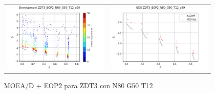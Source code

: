\begin{figure}[H]
\begin{tabular}{c c}
    \includegraphics[scale=0.5]{figures/ZDT3_EOP2_N80_G50_T12/s99_dev.png} &
    \includegraphics[scale=0.5]{figures/ZDT3_EOP2_N80_G50_T12/s99_nds.png}\\
    \end{tabular}
    \caption{MOEA/D + EOP2 para ZDT3 con N80 G50 T12 }
    \label{fig:14}
\end{figure}

